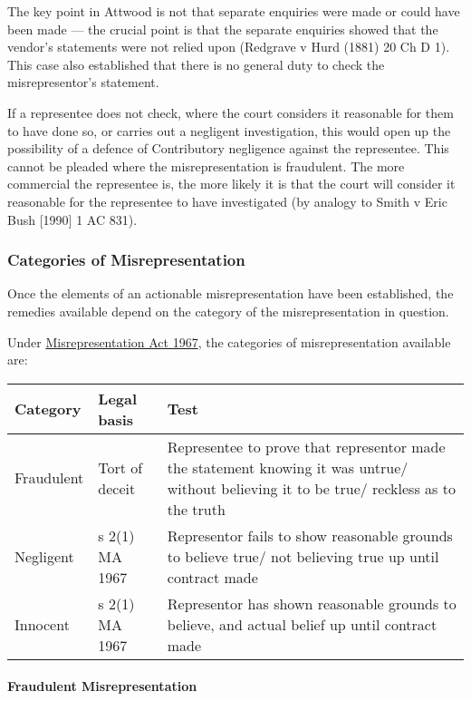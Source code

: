\documentclass[
]{article}
\begin{document}
The key point in Attwood is not that separate enquiries were made or
could have been made --- the crucial point is that the separate
enquiries showed that the vendor's statements were not relied upon
(Redgrave v Hurd (1881) 20 Ch D 1). This case also established that
there is no general duty to check the misrepresentor's statement.

If a representee does not check, where the court considers it reasonable
for them to have done so, or carries out a negligent investigation, this
would open up the possibility of a defence of Contributory negligence
against the representee. This cannot be pleaded where the
misrepresentation is fraudulent. The more commercial the representee is,
the more likely it is that the court will consider it reasonable for the
representee to have investigated (by analogy to Smith v Eric Bush
{[}1990{]} 1 AC 831).

\hypertarget{categories-of-misrepresentation}{%
\subsubsection{Categories of
Misrepresentation}\label{categories-of-misrepresentation}}

Once the elements of an actionable misrepresentation have been
established, the remedies available depend on the category of the
misrepresentation in question.

Under
\href{https://www.legislation.gov.uk/ukpga/1967/7}{Misrepresentation Act
1967}, the categories of misrepresentation available are:

\begin{longtable}[]{@{}lll@{}}
\toprule()
Category & Legal basis & Test \\
\midrule()
\endhead
Fraudulent & Tort of deceit & Representee to prove that representor made
the statement knowing it was untrue/ without believing it to be true/
reckless as to the truth \\
Negligent & s 2(1) MA 1967 & Representor fails to show reasonable
grounds to believe true/ not believing true up until contract made \\
Innocent & s 2(1) MA 1967 & Representor has shown reasonable grounds to
believe, and actual belief up until contract made \\
\bottomrule()
\end{longtable}

\hypertarget{fraudulent-misrepresentation}{%
\paragraph{Fraudulent
Misrepresentation}\label{fraudulent-misrepresentation}}
\end{document}
